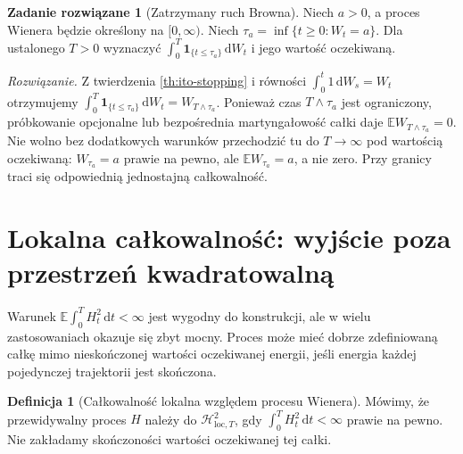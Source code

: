 \documentclass[11pt,a4paper,oneside]{report}
\numberwithin{equation}{chapter}
\theoremstyle{plain}
\theoremstyle{definition}
\newtheorem{definicja}{Definicja}[chapter]
\newtheorem{zadanie}{Zadanie rozwiązane}[chapter]
\theoremstyle{remark}
\newcommand{\E}{\mathbb{E}}
\newcommand{\calH}{\mathcal{H}}
\newcommand{\ind}[1]{\mathbf{1}_{#1}}
\newcommand{\dd}{\mathrm{d}}
\begin{document}
\begin{zadanie}[Zatrzymany ruch Browna]
Niech $a>0$, a proces Wienera będzie określony na
$[0,\infty)$. Niech $\tau_a=\inf\{t\ge0:W_t=a\}$.
Dla ustalonego $T>0$
wyznaczyć $\int_0^T\ind{\{t\le\tau_a\}}\,\dd W_t$
i jego wartość oczekiwaną.

\emph{Rozwiązanie.} Z twierdzenia \ref{th:ito-stopping}
i równości $\int_0^t1\,\dd W_s=W_t$ otrzymujemy
$\int_0^T\ind{\{t\le\tau_a\}}\,\dd W_t=W_{T\wedge\tau_a}$.
Ponieważ czas $T\wedge\tau_a$ jest ograniczony,
próbkowanie opcjonalne lub bezpośrednia martyngałowość
całki daje $\E W_{T\wedge\tau_a}=0$.
Nie wolno bez dodatkowych warunków przechodzić tu do
$T\to\infty$ pod wartością oczekiwaną:
$W_{\tau_a}=a$ prawie na pewno, ale $\E W_{\tau_a}=a$,
a nie zero. Przy granicy traci się odpowiednią
jednostajną całkowalność.
\end{zadanie}

\section{Lokalna całkowalność: wyjście poza przestrzeń kwadratowalną}\label{sec:volIII:02:06}
Warunek $\E\int_0^T H_t^2\,\dd t<\infty$ jest
wygodny do konstrukcji, ale w wielu zastosowaniach
okazuje się zbyt mocny. Proces może mieć dobrze
zdefiniowaną całkę mimo nieskończonej wartości oczekiwanej
energii, jeśli energia każdej pojedynczej trajektorii
jest skończona.

\begin{definicja}[Całkowalność lokalna względem procesu Wienera]\label{def:volIII:02:04}
Mówimy, że przewidywalny proces $H$ należy do
$\calH_{\mathrm{loc},T}^2$, gdy
$\int_0^T H_t^2\,\dd t<\infty$ prawie na pewno.
Nie zakładamy skończoności wartości oczekiwanej tej całki.
\end{definicja}
\end{document}
